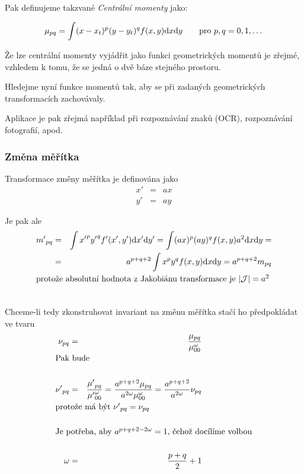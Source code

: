 Pak definujeme takzvané {\em Centrální momenty}  jako:

\begin{equation}
\mu_{pq}=\int (x-x_t)^p(y-y_t)^qf(x,y){\rm d} x{\rm d} y\qquad \hbox{pro $p,q=0,1,\dots$}
\end{equation}

Že lze centrální momenty vyjádřit jako funkci geometrických momentů je zřejmé, vzhledem k tomu, že se jedná o dvě 
báze stejného prostoru.

Hledejme nyní funkce momentů tak, aby se při zadaných geometrických transformacích zachovávaly. 

Aplikace je pak zřejmá například při rozpoznávání znaků (OCR), rozpoznávání fotografií, apod.

\subsubsection{Změna měřítka}
Transformace změny měřítka je definována jako
\begin{eqnarray}
x'&=&ax\nonumber\\
y'&=&ay
\end{eqnarray}

Je pak ale
\begin{eqnarray}
{m'}_{pq}&=&\int {x'}^p{y'}^q{f'}(x',y')\d x'\d y'=\int (ax)^p(ay)^qf(x,y)a^2\d x\d y=\nonumber\\
&=&a^{p+q+2}\int x^py^qf(x,y)\d x\d y=a^{p+q+2} m_{pq}\\
\noalign{\hbox{protože absolutní hodnota z Jakobiánu transformace je $|\mathcal{J}|=a^2$}}\nonumber
\end{eqnarray}

Chceme-li tedy zkonstruhovat invariant na změnu měřítka stačí ho předpokládat ve tvaru
\begin{eqnarray}
\nu_{pq}&=&\frac{\mu_{pq}}{\mu^\omega_{00}}\\
\noalign{\hbox{Pak bude}\nonumber}\\
{\nu'}_{pq}&=&\frac{{\mu'}_{pq}} {{\mu'}^\omega_{00}}=\frac{a^{p+q+2}\mu_{pq}}{a^{2\omega}\mu^\omega_{00}}=
\frac{a^{p+q+2}}{a^{2\omega}}\nu_{pq}\nonumber\\
\noalign{\hbox{protože má být ${\nu'}_{pq}=\nu_{pq}$}\nonumber}\\
\noalign{\hbox{Je potřeba, aby $a^{p+q+2-2\omega}=1$, čehož docílíme volbou}\nonumber}\\
\omega&=&\frac{p+q}{2}+1
\end{eqnarray}


